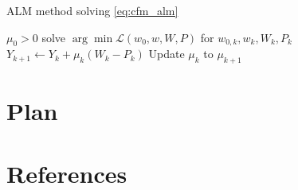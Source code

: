 \documentclass{article}
\begin{document}
\begin{algorithm} 
  \caption{ALM method solving \cref{eq:cfm_alm}}
  \label{algo:alm}
  \begin{algorithmic}[1]
    \STATE $\mu_0 > 0$
      \STATE solve $\arg\min \mathcal{L}(w_0, w, W, P)$ for $w_{0,k}, w_k, W_k, P_k$ 
      \STATE $Y_{k + 1} \leftarrow Y_{k} + \mu_k (W_k - P_k)$
      \STATE Update $\mu_k$ to $\mu_{k+1}$
    \ENDWHILE
  \end{algorithmic}
\end{algorithm}



\section{Plan}


\section*{References}
\small{
\renewcommand{\section}[2]{}%
 

}
\end{document}
